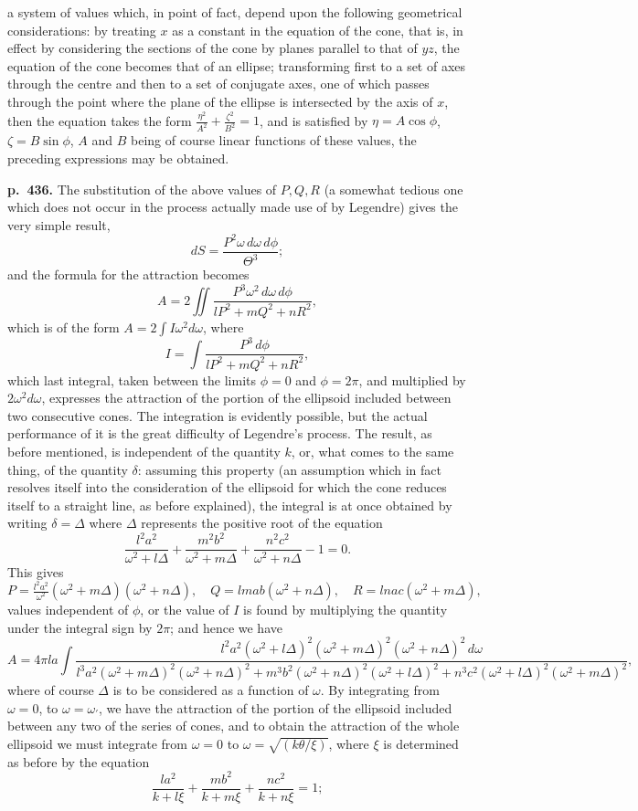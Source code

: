 \documentclass[11pt]{article}
\begin{document}
a system of values which, in point of fact, depend upon the following geometrical considerations: by treating $x$ as a constant in the equation of the cone, that is, in effect by considering the sections of the cone by planes parallel to that of $yz$, the equation of the cone becomes that of an ellipse; transforming first to a set of axes through the centre and then to a set of conjugate axes, one of which passes through the point where the plane of the ellipse is intersected by the axis of $x$, then the equation takes the form $\frac{\eta^2}{A^2} + \frac{\zeta^2}{B^2} = 1$, and is satisfied by $\eta = A\cos\phi$, $\zeta = B\sin\phi$, $A$ and $B$ being of course linear functions of these values, the preceding expressions may be obtained.

\bigskip
\noindent\textbf{p.~436.} The substitution of the above values of $P, Q, R$ (a somewhat tedious one which does not occur in the process actually made use of by Legendre) gives the very simple result,
\[ dS = \frac{P^2 \omega\,d\omega\,d\phi}{\Theta^3}; \]
and the formula for the attraction becomes
\[ A = 2\iint \frac{P^3 \omega^2\,d\omega\,d\phi}{lP^2 + mQ^2 + nR^2}, \]
which is of the form $A = 2\!\int I\omega^2 d\omega$, where
\[ I = \int \frac{P^3\,d\phi}{lP^2 + mQ^2 + nR^2}, \]
which last integral, taken between the limits $\phi = 0$ and $\phi = 2\pi$, and multiplied by $2\omega^2 d\omega$, expresses the attraction of the portion of the ellipsoid included between two consecutive cones. The integration is evidently possible, but the actual performance of it is the great difficulty of Legendre's process. The result, as before mentioned, is independent of the quantity $k$, or, what comes to the same thing, of the quantity $\delta$: assuming this property (an assumption which in fact resolves itself into the consideration of the ellipsoid for which the cone reduces itself to a straight line, as before explained), the integral is at once obtained by writing $\delta = \Delta$ where $\Delta$ represents the positive root of the equation
\[ \frac{l^2 a^2}{\omega^2 + l\Delta} + \frac{m^2 b^2}{\omega^2 + m\Delta} + \frac{n^2 c^2}{\omega^2 + n\Delta} - 1 = 0. \]
This gives
\[ P = \tfrac{l^2 a^2}{\omega^2}(\omega^2 + m\Delta)(\omega^2 + n\Delta), \quad Q = lmab(\omega^2 + n\Delta), \quad R = lnac(\omega^2 + m\Delta), \]
values independent of $\phi$, or the value of $I$ is found by multiplying the quantity under the integral sign by $2\pi$; and hence we have
\[ A = 4\pi la \int \frac{l^2 a^2(\omega^2 + l\Delta)^2(\omega^2 + m\Delta)^2(\omega^2 + n\Delta)^2\,d\omega}{l^3 a^2(\omega^2 + m\Delta)^2(\omega^2 + n\Delta)^2 + m^3 b^2(\omega^2 + n\Delta)^2(\omega^2 + l\Delta)^2 + n^3 c^2(\omega^2 + l\Delta)^2(\omega^2 + m\Delta)^2}, \]
where of course $\Delta$ is to be considered as a function of $\omega$. By integrating from $\omega = 0$, to $\omega = \omega_{\prime}$, we have the attraction of the portion of the ellipsoid included between any two of the series of cones, and to obtain the attraction of the whole ellipsoid we must integrate from $\omega = 0$ to $\omega = \sqrt{(k\theta/\xi)}$, where $\xi$ is determined as before by the equation
\[ \frac{la^2}{k + l\xi} + \frac{mb^2}{k + m\xi} + \frac{nc^2}{k + n\xi} = 1; \]
\end{document}
